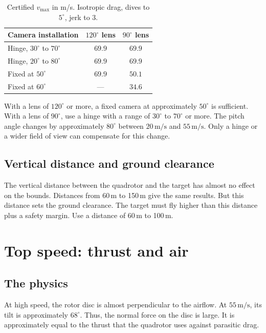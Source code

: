 \documentclass[11pt]{article}
\newcommand{\ms}{\,\mathrm{m/s}}
\begin{document}
\begin{table}[h]
\centering
\caption{Certified $v_{\max}$ in m/s. Isotropic drag, dives to $5^\circ$, jerk to $3$.}
\label{tab:camera}
\begin{tabular}{@{}lcc@{}}
\toprule
Camera installation & $120^\circ$ lens & $90^\circ$ lens \\
\midrule
Hinge, $30^\circ$ to $70^\circ$ & $69.9$ & $69.9$ \\
Hinge, $20^\circ$ to $80^\circ$ & $69.9$ & $69.9$ \\
Fixed at $50^\circ$ & $69.9$ & $\mathbf{50.1}$ \\
Fixed at $60^\circ$ & --- & $\mathbf{34.6}$ \\
\bottomrule
\end{tabular}
\end{table}

With a lens of $120^\circ$ or more, a fixed camera at approximately $50^\circ$ is sufficient.
With a lens of $90^\circ$, use a hinge with a range of $30^\circ$ to $70^\circ$ or more.
The pitch angle changes by approximately $80^\circ$ between $20\ms$ and $55\ms$.
Only a hinge or a wider field of view can compensate for this change.

\subsection{Vertical distance and ground clearance}

The vertical distance between the quadrotor and the target has almost no effect on the bounds.
Distances from 60\,m to 150\,m give the same results.
But this distance sets the ground clearance.
The target must fly higher than this distance plus a safety margin.
Use a distance of 60\,m to 100\,m.

\section{Top speed: thrust and air}
\label{sec:speed}

\subsection{The physics}

At high speed, the rotor disc is almost perpendicular to the airflow.
At $55\ms$, its tilt is approximately $68^\circ$.
Thus, the normal force on the disc is large.
It is approximately equal to the thrust that the quadrotor uses against parasitic drag.
\end{document}
